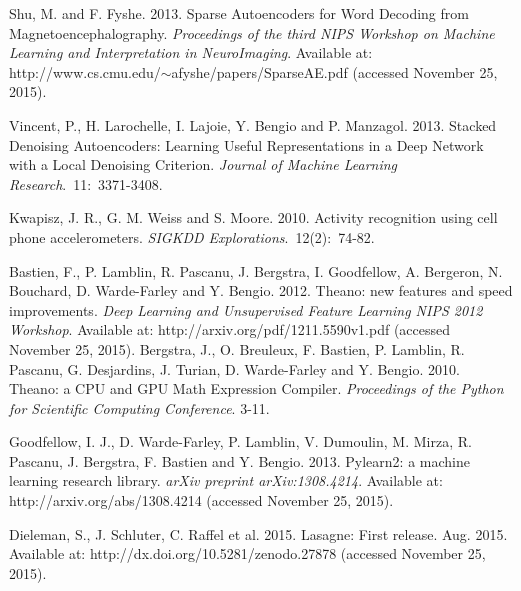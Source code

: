 \documentclass[12pt]{article}
\begin{document}
\begin{thebibliography}{10}
{Shu, M. and F. Fyshe.}
2013. Sparse Autoencoders for Word Decoding from Magnetoencephalography. \emph{Proceedings of the third NIPS Workshop on Machine Learning and Interpretation in NeuroImaging}. Available at: http://www.cs.cmu.edu/$\sim$afyshe/papers/SparseAE.pdf
(accessed November 25, 2015).

{Vincent, P., H. Larochelle, I. Lajoie, Y. Bengio and
P. Manzagol.}
2013. Stacked Denoising Autoencoders: Learning Useful Representations in
a Deep Network with a Local Denoising Criterion. \emph{Journal of Machine Learning Research}.~11:~3371-3408.




{Kwapisz, J. R., G. M. Weiss and S. Moore.}
2010. Activity recognition using cell phone
accelerometers. \emph{SIGKDD Explorations}.~12(2):~74-82.

{Bastien, F., P. Lamblin, R. Pascanu, J. Bergstra, I. Goodfellow, A. Bergeron, N. Bouchard, D. Warde-Farley and Y. Bengio.}
2012. Theano: new features and speed improvements. \emph{Deep Learning and Unsupervised Feature Learning NIPS 2012 Workshop}. Available at:  http://arxiv.org/pdf/1211.5590v1.pdf
(accessed November 25, 2015).
{Bergstra, J., O. Breuleux, F. Bastien, P. Lamblin, R. Pascanu, G. Desjardins, J. Turian, D. Warde-Farley and Y. Bengio.}
2010. Theano: a {CPU} and {GPU} Math Expression Compiler. \emph{Proceedings of the Python for Scientific Computing Conference}. 3-11.

{Goodfellow, I. J., D. Warde-Farley, P. Lamblin, V. Dumoulin, M. Mirza, R. Pascanu, J. Bergstra, F. Bastien and Y. Bengio.}
2013. Pylearn2: a machine learning research library. \emph{arXiv preprint arXiv:1308.4214}. Available at: http://arxiv.org/abs/1308.4214 (accessed November 25, 2015).

{Dieleman, S., J. Schluter, C. Raffel et al.}
2015. {Lasagne: First release.}
Aug. 2015. Available at: http://dx.doi.org/10.5281/zenodo.27878 (accessed November 25, 2015).


\end{thebibliography}
\end{document}
